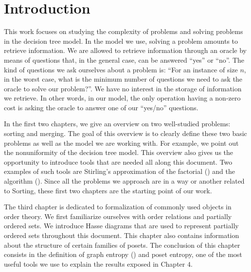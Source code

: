 \chapter*{Introduction}
%

This work focuses on studying the complexity of problems and solving problems
in the decision tree model. In the model we use, solving a problem
amounts to retrieve information. We are allowed to retrieve information
through an oracle by means of questions that, in the general case,
can be answered ``yes'' or ``no''. The kind of questions we ask ourselves
about a problem is: ``For an instance of size \(n\), in the worst case, what is
the minimum number of questions we need to ask the oracle to solve our
problem?''. We have no interest in the storage of information we retrieve.
In other words, in our model, the only operation having a non-zero cost is
asking the oracle to answer one of our ``yes/no'' questions.

In the first two chapters, we give an overview on two well-studied problems:
sorting and merging. The goal of this overview is to clearly define these two
basic problems as well as the model we are working with. For example, we point
out the nonuniformity of the decision tree model. This overview also gives us
the opportunity to introduce tools that are needed all along this document. Two
examples of such tools are Stirling's approximation of the factorial
(\cite{feller1967direct}) and the \mergesort algorithm
(\cite{goldstine:1948,leiserson:2001}). Since all the problems we approach are in
a way or another related to Sorting, these first two chapters are the starting
point of our work.

The third chapter is dedicated to formalization of commonly used objects
in order theory. We first familiarize ourselves with order
relations and partially ordered sets. We introduce Hasse diagrams that
are used to represent partially ordered sets throughout this document.
This chapter also contains information about the structure of
certain families of posets. The conclusion of this
chapter consists in the definition of graph entropy (\cite{korner1973coding})
and poset entropy, one of the most useful tools we use to explain the
results exposed in Chapter \(4\).

